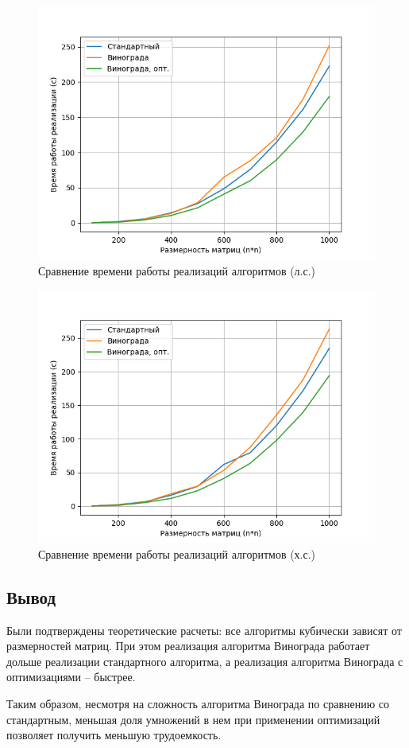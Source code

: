 \begin{figure}[h!btp]
	\centering
	\includegraphics[width=360pt]{inc/plots-best.png}
	\caption{Сравнение времени работы реализаций алгоритмов (л.с.)}
	\label{fig:plots-best}	
\end{figure}

\begin{figure}[h!btp]
	\centering
	\includegraphics[width=360pt]{inc/plots-worst.png}
	\caption{Сравнение времени работы реализаций алгоритмов (х.с.)}
	\label{fig:plots-worst}	
\end{figure}


\clearpage
\subsection*{Вывод}
Были подтверждены теоретические расчеты: все алгоритмы кубически зависят от размерностей матриц. При этом реализация алгоритма Винограда работает дольше реализации стандартного алгоритма, а реализация алгоритма Винограда с оптимизациями -- быстрее.
 
Таким образом, несмотря на сложность алгоритма Винограда по сравнению со стандартным, меньшая доля умножений в нем при применении оптимизаций позволяет получить меньшую трудоемкость.